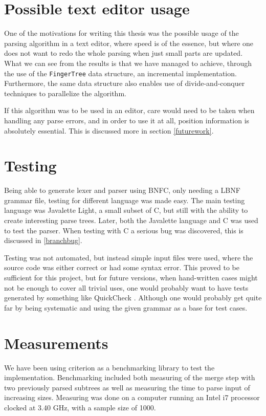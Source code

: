 \documentclass[a4paper,12pt,twosided]{report}
\renewcommand\cite{\citep}
\begin{document}
\section{Possible text editor usage}
One of the motivations for writing this thesis was the possible usage of the
parsing algorithm in a text editor, where speed is of the essence, but where one
does not want to redo the whole parsing when just small parts are updated. What
we can see from the results is that we have managed to achieve, through the use
of the \texttt{FingerTree} data structure, an incremental implementation.
Furthermore, the same data structure also enables use of divide-and-conquer
techniques to parallelize the algorithm. 

If this algorithm was to be used in an editor, care would need to be taken when
handling any parse errors, and in order to use it at all, position information
is absolutely essential. This is discussed more in section \ref{futurework}.

\section{Testing}
Being able to generate lexer and parser using BNFC, only needing a LBNF grammar
file, testing for different language was made easy. The main testing language
was Javalette Light, a small subset of C, but still with the ability to create
interesting parse trees. Later, both the Javalette language and C was used to
test the parser. When testing with C a serious bug was discovered, this is
discussed in \ref{branchbug}.

Testing was not automated, but instead simple input files were used, where the
source code was either correct or had some syntax error. This proved to be
sufficient for this project, but for future versions, when hand-written cases
might not be enough to cover all trivial uses, one would probably want to have
tests generated by something like QuickCheck \cite{quickcheck}. Although one
would probably get quite far by being systematic and using the given grammar as
a base for test cases. 

\section{Measurements}
We have been using criterion \cite{criterion} as a benchmarking library to test
the implementation. Benchmarking included both measuring of the merge step with
two previously parsed subtrees as well as measuring the time to parse input of
increasing sizes. Measuring was done on a computer running an Intel i7 processor
clocked at 3.40 GHz, with a sample size of 1000. 
\end{document}
